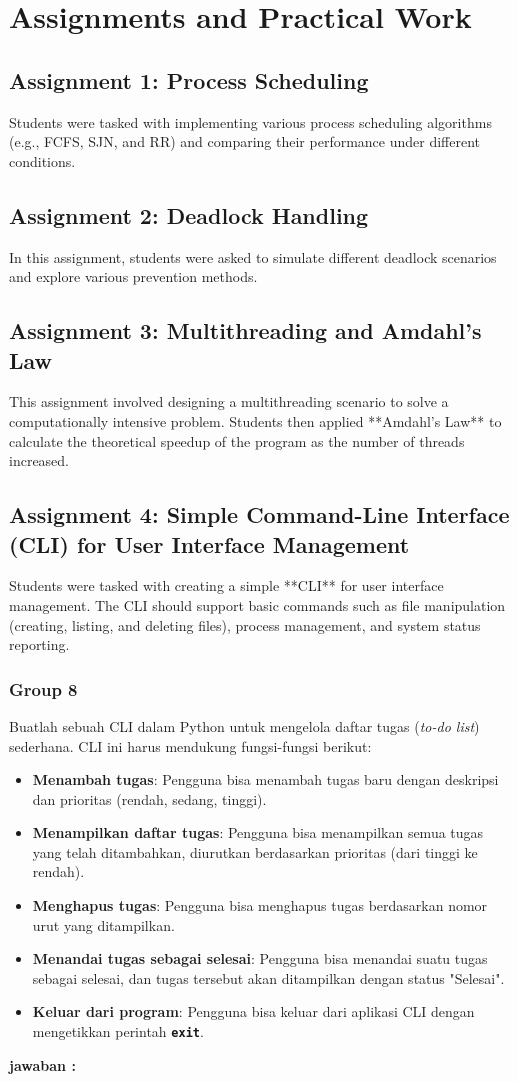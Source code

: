 \documentclass[12pt]{article}
\begin{document}
	\section{Assignments and Practical Work}
	\subsection{Assignment 1: Process Scheduling}
	Students were tasked with implementing various process scheduling algorithms (e.g., FCFS, SJN, and RR) and comparing their performance under different conditions.
	
	\subsection{Assignment 2: Deadlock Handling}
	In this assignment, students were asked to simulate different deadlock scenarios and explore various prevention methods.
	
	\subsection{Assignment 3: Multithreading and Amdahl's Law}
	This assignment involved designing a multithreading scenario to solve a computationally intensive problem. Students then applied **Amdahl's Law** to calculate the theoretical speedup of the program as the number of threads increased.
	
	\subsection{Assignment 4: Simple Command-Line Interface (CLI) for User Interface Management}
	Students were tasked with creating a simple **CLI** for user interface management. The CLI should support basic commands such as file manipulation (creating, listing, and deleting files), process management, and system status reporting.
	\subsubsection{Group 8}
	Buatlah sebuah CLI dalam Python untuk mengelola daftar tugas (\textit{to-do list}) sederhana. CLI ini harus mendukung fungsi-fungsi berikut:
	\begin{itemize}
		\item \textbf{Menambah tugas}: Pengguna bisa menambah tugas baru dengan deskripsi dan prioritas (rendah, sedang, tinggi).
		\item \textbf{Menampilkan daftar tugas}: Pengguna bisa menampilkan semua tugas yang telah ditambahkan, diurutkan berdasarkan prioritas (dari tinggi ke rendah).
		\item \textbf{Menghapus tugas}: Pengguna bisa menghapus tugas berdasarkan nomor urut yang ditampilkan.
		\item \textbf{Menandai tugas sebagai selesai}: Pengguna bisa menandai suatu tugas sebagai selesai, dan tugas tersebut akan ditampilkan dengan status "Selesai".
		\item \textbf{Keluar dari program}: Pengguna bisa keluar dari aplikasi CLI dengan mengetikkan perintah \texttt{\textbf{exit}}.
	\end{itemize}
	\textbf{jawaban :}
	
\end{document}
